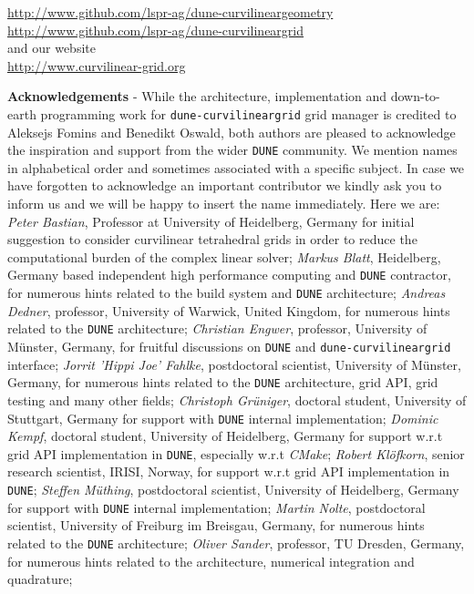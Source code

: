 \documentclass[a4paper,11pt]{article}
\newcommand{\dune}{\setlength\emergencystretch{3cm}\texttt{DUNE}}
\newcommand{\curvgrid}{\setlength\emergencystretch{3cm}\texttt{dune-curvilineargrid}}
\begin{document}
\begin{titlepage}
\noindent
\url{http://www.github.com/lspr-ag/dune-curvilineargeometry}\\
\url{http://www.github.com/lspr-ag/dune-curvilineargrid}\\

\noindent
and our website\\

\noindent
\url{http://www.curvilinear-grid.org}

\end{titlepage}






\pagebreak
\vspace{15mm}
\noindent \textbf{Acknowledgements} - While the architecture, implementation and down-to-earth programming work for \curvgrid{} grid manager is credited to Aleksejs Fomins and Benedikt Oswald, both authors are pleased to acknowledge the inspiration and support from the wider \dune{} community. We mention names in alphabetical order and sometimes associated with a specific subject. In case we have forgotten to acknowledge an important contributor we kindly ask you to inform us and we will be happy to insert the name immediately. Here we are:
\textit{Peter Bastian}, Professor at University of Heidelberg, Germany for initial suggestion to consider curvilinear tetrahedral grids in order to reduce the computational burden of the complex linear solver;
\textit{Markus Blatt}, Heidelberg, Germany based independent high performance computing and \dune{} contractor, for numerous hints related to the build system and \dune{} architecture;
\textit{Andreas Dedner}, professor, University of Warwick, United Kingdom, for numerous hints related to the \dune{} architecture;
\textit{Christian Engwer}, professor, University of M\"unster, Germany, for fruitful discussions on \dune{} and \curvgrid{} interface;
\textit{Jorrit 'Hippi Joe' Fahlke}, postdoctoral scientist, University of M\"unster, Germany, for numerous hints related to the \dune{} architecture, grid API, grid testing and many other fields;
\textit{Christoph Gr\"uniger}, doctoral student, University of Stuttgart, Germany for support with \dune{} internal implementation;
\textit{Dominic Kempf}, doctoral student, University of Heidelberg, Germany for support w.r.t grid API implementation in \dune{}, especially w.r.t \textit{CMake};
\textit{Robert Kl\"ofkorn}, senior research scientist, IRISI, Norway, for support w.r.t grid API implementation in \dune{};
\textit{Steffen M\"uthing}, postdoctoral scientist, University of Heidelberg, Germany for support with \dune{} internal implementation;
\textit{Martin Nolte}, postdoctoral scientist, University of Freiburg im Breisgau, Germany, for numerous hints related to the \dune{} architecture;
\textit{Oliver Sander}, professor, TU Dresden, Germany, for numerous hints related to the  architecture, numerical integration and quadrature; \\
\end{document}
